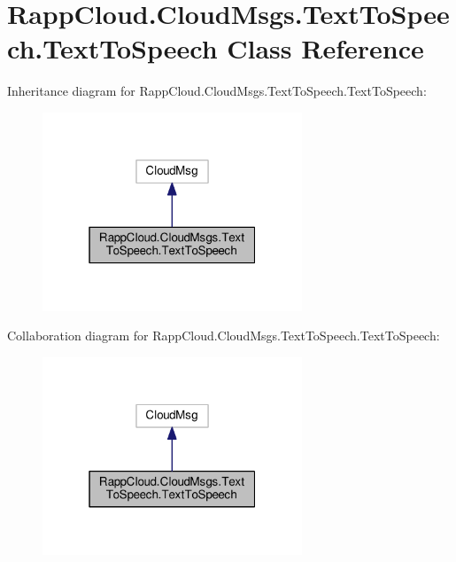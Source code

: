 \hypertarget{classRappCloud_1_1CloudMsgs_1_1TextToSpeech_1_1TextToSpeech}{\section{Rapp\-Cloud.\-Cloud\-Msgs.\-Text\-To\-Speech.\-Text\-To\-Speech Class Reference}
\label{classRappCloud_1_1CloudMsgs_1_1TextToSpeech_1_1TextToSpeech}
}


Inheritance diagram for Rapp\-Cloud.\-Cloud\-Msgs.\-Text\-To\-Speech.\-Text\-To\-Speech\-:
\nopagebreak
\begin{figure}[H]
\begin{center}
\leavevmode
\includegraphics[width=220pt]{classRappCloud_1_1CloudMsgs_1_1TextToSpeech_1_1TextToSpeech__inherit__graph}
\end{center}
\end{figure}


Collaboration diagram for Rapp\-Cloud.\-Cloud\-Msgs.\-Text\-To\-Speech.\-Text\-To\-Speech\-:
\nopagebreak
\begin{figure}[H]
\begin{center}
\leavevmode
\includegraphics[width=220pt]{classRappCloud_1_1CloudMsgs_1_1TextToSpeech_1_1TextToSpeech__coll__graph}
\end{center}
\end{figure}
